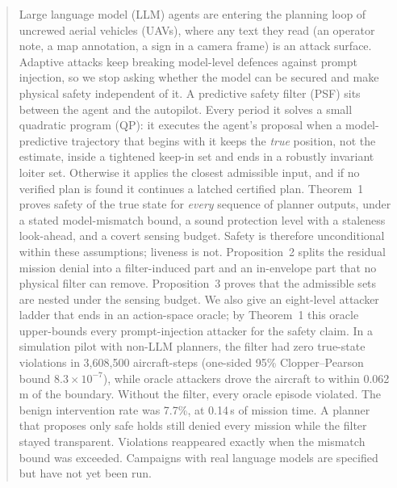 \ifanonymous
\author{}
\else
\author{}
\fi

\maketitle

\begin{abstract}
Large language model (LLM) agents are entering the planning loop of
uncrewed aerial vehicles (UAVs), where any text they read (an operator
note, a map annotation, a sign in a camera frame) is an attack surface.
Adaptive attacks keep breaking model-level defences against prompt
injection, so we stop asking whether the model can be secured and make
physical safety independent of it. A predictive safety filter (PSF) sits
between the agent and the autopilot. Every period it solves a small
quadratic program (QP): it executes the agent's proposal when a
model-predictive trajectory that begins with it keeps the \emph{true}
position, not the estimate, inside a tightened keep-in set and ends in a
robustly invariant loiter set. Otherwise it applies the closest admissible
input, and if no verified plan is found it continues a latched certified
plan. Theorem~1 proves safety of the true state for \emph{every}
sequence of planner outputs, under a stated model-mismatch bound, a sound
protection level with a staleness look-ahead, and a covert sensing budget.
Safety is therefore unconditional within these assumptions; liveness is
not. Proposition~2 splits the residual mission denial into a
filter-induced part and an in-envelope part that no physical filter can
remove. Proposition~3 proves that the admissible sets are nested under the
sensing budget. We also give an eight-level attacker ladder that ends in an
action-space oracle; by Theorem~1 this oracle upper-bounds every
prompt-injection attacker for the safety claim. In a simulation pilot with
non-LLM planners, the filter had zero true-state violations in 3,608,500
aircraft-steps (one-sided 95\% Clopper--Pearson bound
$8.3\times10^{-7}$), while oracle attackers drove the aircraft to within
0.062\,m of the boundary. Without the filter, every oracle episode
violated. The benign intervention rate was 7.7\%, at 0.14\,s of mission
time. A planner that proposes only safe holds still denied every mission
while the filter stayed transparent. Violations reappeared exactly when
the mismatch bound was exceeded. Campaigns with real language models are
specified but have not yet been run.
\end{abstract}

